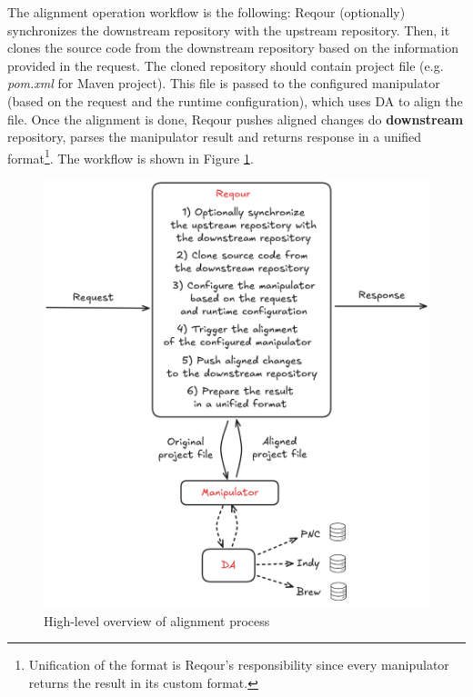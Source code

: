 \documentclass[../main.tex]{subfiles}
\begin{document}
The alignment operation workflow is the following: Reqour (optionally) synchronizes the downstream repository with the upstream repository. Then, it clones the source code from the downstream repository based on the information provided in the request. The cloned repository should contain project file (e.g. \textit{pom.xml} for Maven project). This file is passed to the configured manipulator (based on the request and the runtime configuration), which uses DA to align the file. Once the alignment is done, Reqour pushes aligned changes do \textbf{downstream} repository, parses the manipulator result and returns response in a unified format\footnote{Unification of the format is Reqour's responsibility since every manipulator returns the result in its custom format.}.
The workflow is shown in Figure \ref{fig:alignment-process}.

\begin{figure}
  \begin{center}
    \includegraphics[width=\textwidth]{images/alignment-process.png}
  \end{center}
  \caption{High-level overview of alignment process}
  \label{fig:alignment-process}
\end{figure}
\end{document}
